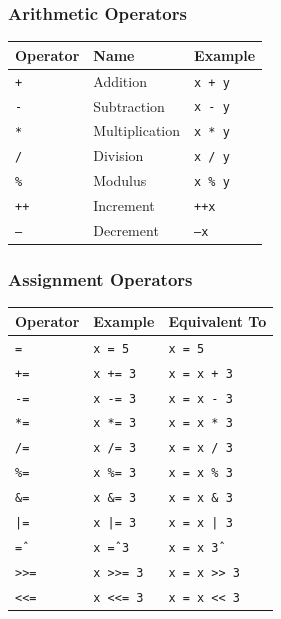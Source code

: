 \documentclass{article}
\begin{document}
\subsubsection{Arithmetic Operators}
\begin{center}
\begin{tabular}{@{}lll@{}}
\toprule
\textbf{Operator} & \textbf{Name} & \textbf{Example} \\
\midrule
\texttt{+}  & Addition       & \texttt{x + y} \\
\texttt{-}  & Subtraction    & \texttt{x - y} \\
\texttt{*}  & Multiplication & \texttt{x * y} \\
\texttt{/}  & Division       & \texttt{x / y} \\
\texttt{\%} & Modulus        & \texttt{x \% y} \\
\texttt{++} & Increment      & \texttt{++x} \\
\texttt{--} & Decrement      & \texttt{--x} \\
\bottomrule
\end{tabular}
\end{center}

\vspace{1em}
\subsubsection{Assignment Operators}
\begin{center}
\begin{tabular}{@{}lll@{}}
\toprule
\textbf{Operator} & \textbf{Example} & \textbf{Equivalent To} \\
\midrule
\texttt{=}    & \texttt{x = 5}    & \texttt{x = 5} \\
\texttt{+=}   & \texttt{x += 3}   & \texttt{x = x + 3} \\
\texttt{-=}   & \texttt{x -= 3}   & \texttt{x = x - 3} \\
\texttt{*=}   & \texttt{x *= 3}   & \texttt{x = x * 3} \\
\texttt{/=}   & \texttt{x /= 3}   & \texttt{x = x / 3} \\
\texttt{\%=}  & \texttt{x \%= 3}  & \texttt{x = x \% 3} \\
\texttt{\&=}  & \texttt{x \&= 3}  & \texttt{x = x \& 3} \\
\texttt{|=}   & \texttt{x |= 3}   & \texttt{x = x | 3} \\
\texttt{\^=}  & \texttt{x \^= 3}  & \texttt{x = x \^ 3} \\
\texttt{>>=}  & \texttt{x >>= 3}  & \texttt{x = x >> 3} \\
\texttt{<<=}  & \texttt{x <<= 3}  & \texttt{x = x << 3} \\
\bottomrule
\end{tabular}
\end{center}
\end{document}
